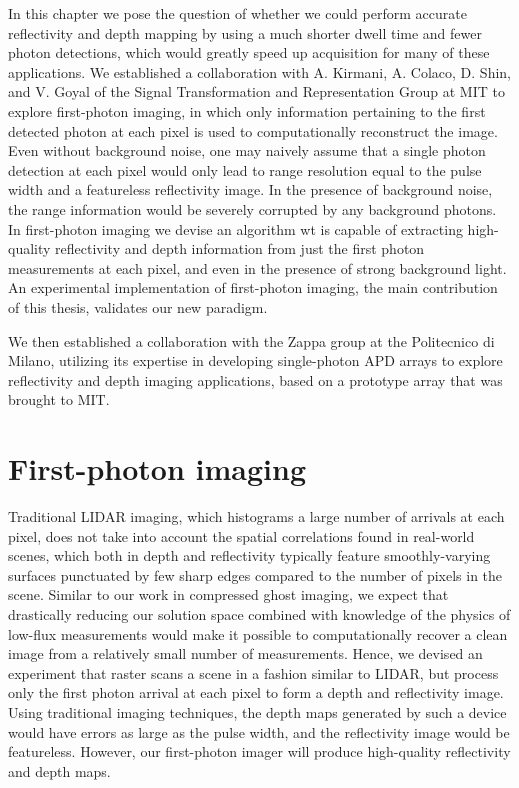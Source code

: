 In this chapter we pose the question of whether we could perform accurate reflectivity and depth mapping by using a much shorter dwell time and fewer photon detections, which would greatly speed up acquisition for many of these applications. We established a collaboration with A. Kirmani, A. Colaco, D. Shin, and V. Goyal of the Signal Transformation and Representation Group at MIT to explore first-photon imaging, in which only information pertaining to the first detected photon at each pixel is used to computationally reconstruct the image. Even without background noise, one may naively assume that a single photon detection at each pixel would only lead to range resolution equal to the pulse width and a featureless reflectivity image. In the presence of background noise, the range information would be severely corrupted by any background photons. In first-photon imaging we devise an algorithm wt is capable of extracting high-quality reflectivity and depth information from just the first photon measurements at each pixel, and even in the presence of strong background light. An experimental implementation of first-photon imaging, the main contribution of this thesis, validates our new paradigm.

We then established a collaboration with the Zappa group at the Politecnico di Milano, utilizing its expertise in developing single-photon APD arrays \cite{villa-spad,guerrieri-two,scarcella-low} to explore reflectivity and depth imaging applications, based on a prototype array that was brought to MIT.

\section{First-photon imaging}

Traditional LIDAR imaging, which histograms a large number of arrivals at each pixel, does not take into account the spatial correlations found in real-world scenes, which both in depth and reflectivity typically feature smoothly-varying surfaces punctuated by few sharp edges compared to the number of pixels in the scene. Similar to our work in compressed ghost imaging, we expect that drastically reducing our solution space combined with knowledge of the physics of low-flux measurements would make it possible to computationally recover a clean image from a relatively small number of measurements. Hence, we devised an experiment that raster scans a scene in a fashion similar to LIDAR, but process only the first photon arrival at each pixel to form a depth and reflectivity image. Using traditional imaging techniques, the depth maps generated by such a device would have errors as large as the pulse width, and the reflectivity image would be featureless. However, our first-photon imager will produce high-quality reflectivity and depth maps.

